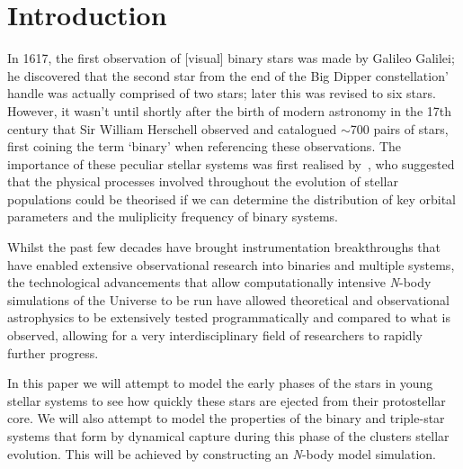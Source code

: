 \section{Introduction}
In 1617, the first observation of [visual] binary stars was made by Galileo Galilei; he discovered that the second star from the end of the Big Dipper constellation' handle was actually comprised of two stars; later this was revised to six stars. However, it wasn't until shortly after the birth of modern astronomy in the 17th century that Sir William Herschell observed and catalogued $\sim$700 pairs of stars, first coining the term `binary' when referencing these observations. The importance of these peculiar stellar systems was first realised by~\cite{kuiperProblemsDoubleStarAstronomy1935}, who suggested that the physical processes involved throughout the evolution of stellar populations could be theorised if we can determine the distribution of key orbital parameters and the muliplicity frequency of binary systems. 

Whilst the past few decades have brought instrumentation breakthroughs that have enabled extensive observational research into binaries and multiple systems, the technological advancements that allow computationally intensive {\slshape N\/}-body simulations of the Universe to be run have allowed theoretical and observational astrophysics to be extensively tested programmatically and compared to what is observed, allowing for a very interdisciplinary field of researchers to rapidly further progress. 

In this paper we will attempt to model the early phases of the stars in young stellar systems to see how quickly these stars are ejected from their protostellar core. We will also attempt to model the properties of the binary and triple-star systems that form by dynamical capture during this phase of the clusters stellar evolution. This will be achieved by constructing an {\slshape N\/}-body model simulation.









